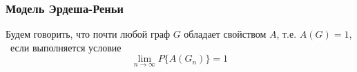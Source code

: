 \frametitle{Модель Эрдеша-Реньи} 

\begin{rdefinition}   
    Будем говорить, что почти любой граф $G$ обладает свойством $A$, т.е. $A(G) = 1$, \
    если выполняется условие
    \[
        \lim_{n \to \infty} P\{ A(G_n) \} = 1
    \] 
\end{rdefinition}